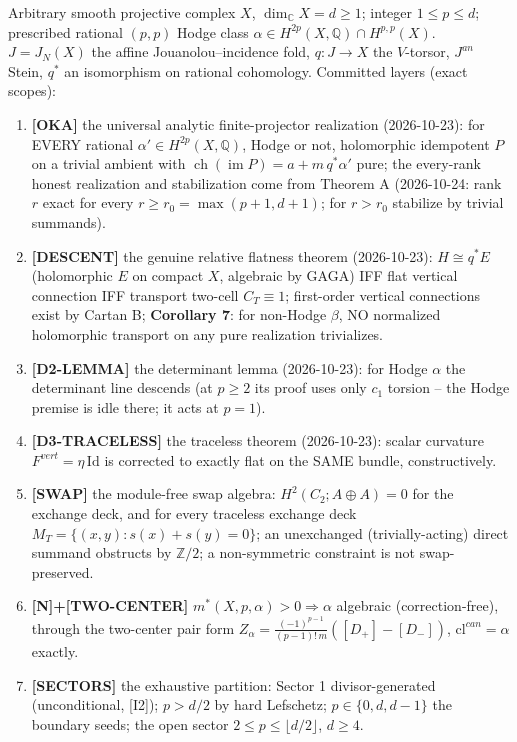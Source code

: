 \documentclass[11pt]{article}
\newcommand{\ch}{\operatorname{ch}}
\newcommand{\im}{\operatorname{im}}
\newcommand{\C}{\mathbb C}
\newcommand{\Z}{\mathbb Z}
\newcommand{\Q}{\mathbb Q}
\begin{document}
Arbitrary smooth projective complex $X$, $\dim_\C X = d \ge 1$; integer $1 \le p \le d$; prescribed rational $(p,p)$ Hodge class $\alpha \in H^{2p}(X,\Q)\cap H^{p,p}(X)$. $J = J_N(X)$ the affine Jouanolou--incidence fold, $q:J\to X$ the $V$-torsor, $J^{an}$ Stein, $q^*$ an isomorphism on rational cohomology. Committed layers (exact scopes):
\begin{enumerate}
\item \textbf{[OKA]} the universal analytic finite-projector realization (2026-10-23): for EVERY rational $\alpha'\in H^{2p}(X,\Q)$, Hodge or not, holomorphic idempotent $P$ on a trivial ambient with $\ch(\im P)=a+m\,q^*\alpha'$ pure; the every-rank honest realization and stabilization come from Theorem A (2026-10-24: rank $r$ exact for every $r\ge r_0=\max(p+1,d+1)$; for $r>r_0$ stabilize by trivial summands).
\item \textbf{[DESCENT]} the genuine relative flatness theorem (2026-10-23): $H\cong q^*E$ (holomorphic $E$ on compact $X$, algebraic by GAGA) IFF flat vertical connection IFF transport two-cell $C_T\equiv1$; first-order vertical connections exist by Cartan B; \textbf{Corollary 7}: for non-Hodge $\beta$, NO normalized holomorphic transport on any pure realization trivializes.
\item \textbf{[D2-LEMMA]} the determinant lemma (2026-10-23): for Hodge $\alpha$ the determinant line descends (at $p\ge2$ its proof uses only $c_1$ torsion -- the Hodge premise is idle there; it acts at $p=1$).
\item \textbf{[D3-TRACELESS]} the traceless theorem (2026-10-23): scalar curvature $F^{vert}=\eta\,\mathrm{Id}$ is corrected to exactly flat on the SAME bundle, constructively.
\item \textbf{[SWAP]} the module-free swap algebra: $H^2(C_2;A\oplus A)=0$ for the exchange deck, and for every traceless exchange deck $M_T=\{(x,y):s(x)+s(y)=0\}$; an unexchanged (trivially-acting) direct summand obstructs by $\Z/2$; a non-symmetric constraint is not swap-preserved.
\item \textbf{[N]+[TWO-CENTER]} $m^*(X,p,\alpha)>0\Rightarrow\alpha$ algebraic (correction-free), through the two-center pair form $Z_\alpha=\frac{(-1)^{p-1}}{(p-1)!\,m}([D_+]-[D_-])$, $\mathrm{cl}^{can}=\alpha$ exactly.
\item \textbf{[SECTORS]} the exhaustive partition: Sector 1 divisor-generated (unconditional, [I2]); $p>d/2$ by hard Lefschetz; $p\in\{0,d,d-1\}$ the boundary seeds; the open sector $2\le p\le\lfloor d/2\rfloor$, $d\ge4$.
\end{enumerate}
\end{document}
